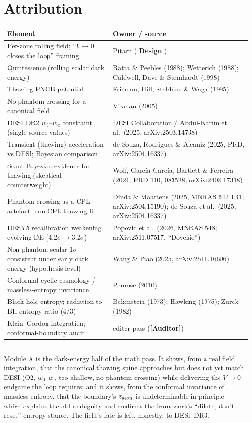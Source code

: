 \documentclass[11pt]{article}
\newcommand{\Design}{\textbf{\textcolor{purple!65!black}{[Design]}}}
\newcommand{\Auditor}{\textbf{\textcolor{teal!55!black}{[Auditor]}}}
\begin{document}
\section{Attribution}
\begin{center}\small
\begin{tabular}{@{}p{}p{}@{}}
\toprule
Element & Owner / source \\
\midrule
Per-zone rolling field; ``$V\!\to\!0$ closes the loop'' framing & Pitarn (\Design) \\
Quintessence (rolling scalar dark energy) & Ratra \& Peebles (1988); Wetterich (1988); Caldwell, Dave \& Steinhardt (1998) \\
Thawing PNGB potential & Frieman, Hill, Stebbins \& Waga (1995) \\
No phantom crossing for a canonical field & Vikman (2005) \\
DESI DR2 $w_0$--$w_a$ constraint (single-source values) & DESI Collaboration / Abdul-Karim et al.\ (2025, arXiv:2503.14738) \\
Transient (thawing) acceleration vs DESI; Bayesian comparison & de Souza, Rodrigues \& Alcaniz (2025, PRD, arXiv:2504.16337) \\
Scant Bayesian evidence for thawing (skeptical counterweight) & Wolf, Garc\'ia-Garc\'ia, Bartlett \& Ferreira (2024, PRD 110, 083528; arXiv:2408.17318) \\
Phantom crossing as a CPL artefact; non-CPL thawing fit & Dinda \& Maartens (2025, MNRAS 542 L31; arXiv:2504.15190); de Souza et al.\ (2025; arXiv:2504.16337) \\
DESY5 recalibration weakening evolving-DE (4.2$\sigma\!\to\!$3.2$\sigma$) & Popovic et al.\ (2026, MNRAS 548; arXiv:2511.07517, ``Dovekie'') \\
Non-phantom scalar 1$\sigma$-consistent under early dark energy (hypothesis-level) & Wang \& Piao (2025, arXiv:2511.16606) \\
Conformal cyclic cosmology / massless-entropy invariance & Penrose (2010) \\
Black-hole entropy; radiation-to-BH entropy ratio ($4/3$) & Bekenstein (1973); Hawking (1975); Zurek (1982) \\
Klein--Gordon integration; conformal-boundary audit & editor pass (\Auditor) \\
\bottomrule
\end{tabular}
\end{center}

\vspace{4pt}\hrule\vspace{4pt}
{\small Module A is the dark-energy half of the math pass. It shows, from a real field integration, that the canonical thawing spine approaches but does not yet match DESI (O2, $w_0$--$w_a$ too shallow, no phantom crossing) while delivering the $V\!\to\!0$ endgame the loop requires; and it shows, from the conformal invariance of massless entropy, that the boundary's $z_{\rm aeon}$ is undeterminable in principle --- which explains the old ambiguity and confirms the framework's ``dilute, don't reset'' entropy stance. The field's fate is left, honestly, to DESI~DR3.}
\end{document}
